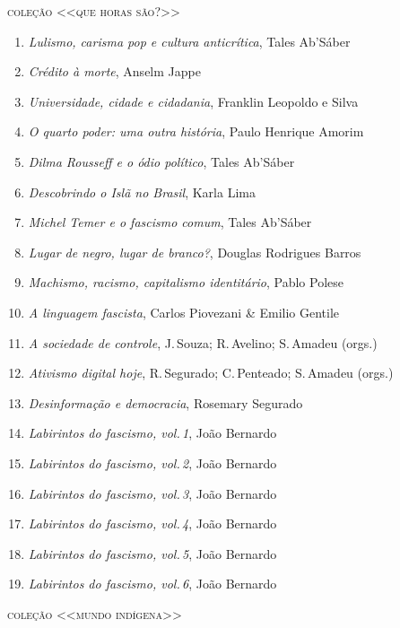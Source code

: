 \medskip
{\large\textsc{coleção <<que horas são?>>}}

\begin{enumerate}
\setlength\parskip{4.2pt}
\setlength\itemsep{-1.4mm}
\item \textit{Lulismo, carisma pop e cultura anticrítica}, Tales Ab'Sáber
\item \textit{Crédito à morte}, Anselm Jappe
\item \textit{Universidade, cidade e cidadania}, Franklin Leopoldo e Silva
\item \textit{O quarto poder: uma outra história}, Paulo Henrique Amorim
\item \textit{Dilma Rousseff e o ódio político}, Tales Ab'Sáber
\item \textit{Descobrindo o Islã no Brasil}, Karla Lima
\item \textit{Michel Temer e o fascismo comum}, Tales Ab'Sáber
\item \textit{Lugar de negro, lugar de branco?}, Douglas Rodrigues Barros
\item \textit{Machismo, racismo, capitalismo identitário}, Pablo Polese
\item \textit{A linguagem fascista}, Carlos Piovezani \& Emilio Gentile
\item \textit{A sociedade de controle}, J.\,Souza; R.\,Avelino; S.\,Amadeu (orgs.)
\item \textit{Ativismo digital hoje}, R.\,Segurado; C.\,Penteado; S.\,Amadeu (orgs.)
\item \textit{Desinformação e democracia}, Rosemary Segurado
\item \textit{Labirintos do fascismo, vol.\,1}, João Bernardo
\item \textit{Labirintos do fascismo, vol.\,2}, João Bernardo
\item \textit{Labirintos do fascismo, vol.\,3}, João Bernardo
\item \textit{Labirintos do fascismo, vol.\,4}, João Bernardo
\item \textit{Labirintos do fascismo, vol.\,5}, João Bernardo
\item \textit{Labirintos do fascismo, vol.\,6}, João Bernardo
\end{enumerate}

\medskip
{\large\textsc{coleção <<mundo indígena>>}}

